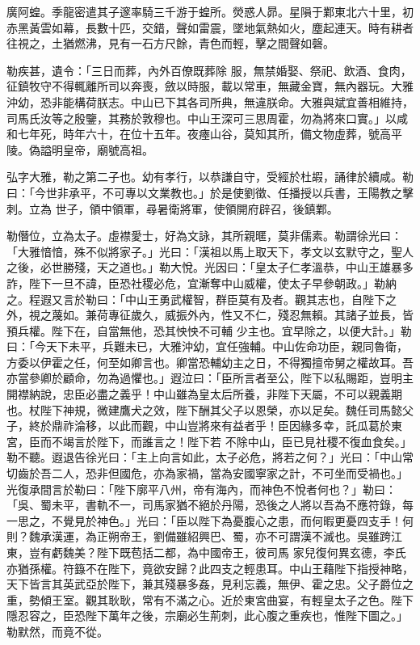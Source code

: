 \begin{pinyinscope}
 廣阿蝗。季龍密遣其子邃率騎三千游于蝗所。熒惑人昴。星隕于鄴東北六十里，初赤黑黃雲如幕，長數十匹，交錯，聲如雷震，墜地氣熱如火，塵起連天。時有耕者往視之，土猶燃沸，見有一石方尺餘，青色而輕，擊之間聲如磬。



 勒疾甚，遺令：「三日而葬，內外百僚既葬除
 服，無禁婚娶、祭祀、飲酒、食肉，征鎮牧守不得輒離所司以奔喪，斂以時服，載以常車，無藏金寶，無內器玩。大雅沖幼，恐非能構荷朕志。中山已下其各司所典，無違朕命。大雅與斌宜善相維持，司馬氏汝等之殷鑒，其務於敦穆也。中山王深可三思周霍，勿為將來口實。」以咸和七年死，時年六十，在位十五年。夜瘞山谷，莫知其所，備文物虛葬，號高平陵。偽謚明皇帝，廟號高祖。



 弘字大雅，勒之第二子也。幼有孝行，以恭謙自守，受經於杜嘏，誦律於續咸。勒曰：「今世非承平，不可專以文業教也。」於是使劉徵、任播授以兵書，王陽教之擊刺。立為
 世子，領中領軍，尋暑衛將軍，使領開府辟召，後鎮鄴。



 勒僭位，立為太子。虛襟愛士，好為文詠，其所親暱，莫非儒素。勒謂徐光曰：「大雅愔愔，殊不似將家子。」光曰：「漢祖以馬上取天下，孝文以玄默守之，聖人之後，必世勝殘，天之道也。」勒大悅。光因曰：「皇太子仁孝溫恭，中山王雄暴多詐，陛下一旦不諱，臣恐社稷必危，宜漸奪中山威權，使太子早參朝政。」勒納之。程遐又言於勒曰：「中山王勇武權智，群臣莫有及者。觀其志也，自陛下之外，視之蔑如。兼荷專征歲久，威振外內，性又不仁，殘忍無賴。其諸子並長，皆預兵權。陛下在，自當無他，恐其怏怏不可輔
 少主也。宜早除之，以便大計。」勒曰：「今天下未平，兵難未已，大雅沖幼，宜任強輔。中山佐命功臣，親同魯衛，方委以伊霍之任，何至如卿言也。卿當恐輔幼主之日，不得獨擅帝舅之權故耳。吾亦當參卿於顧命，勿為過懼也。」遐泣曰：「臣所言者至公，陛下以私賜距，豈明主開襟納說，忠臣必盡之義乎！中山雖為皇太后所養，非陛下天屬，不可以親義期也。杖陛下神規，微建鷹犬之效，陛下酬其父子以恩榮，亦以足矣。魏任司馬懿父子，終於鼎祚淪移，以此而觀，中山豈將來有益者乎！臣因緣多幸，託瓜葛於東宮，臣而不竭言於陛下，而誰言之！陛下若
 不除中山，臣已見社稷不復血食矣。」勒不聽。遐退告徐光曰：「主上向言如此，太子必危，將若之何？」光曰：「中山常切齒於吾二人，恐非但國危，亦為家禍，當為安國寧家之計，不可坐而受禍也。」光復承間言於勒曰：「陛下廓平八州，帝有海內，而神色不悅者何也？」勒曰：「吳、蜀未平，書軌不一，司馬家猶不絕於丹陽，恐後之人將以吾為不應符錄，每一思之，不覺見於神色。」光曰：「臣以陛下為憂腹心之患，而何暇更憂四支手！何則？魏承漢運，為正朔帝王，劉備雖紹興巴、蜀，亦不可謂漢不滅也。吳雖跨江東，豈有虧魏美？陛下既苞括二都，為中國帝王，彼司馬
 家兒復何異玄德，李氏亦猶孫權。符籙不在陛下，竟欲安歸？此四支之輕患耳。中山王藉陛下指授神略，天下皆言其英武亞於陛下，兼其殘暴多姦，見利忘義，無伊、霍之忠。父子爵位之重，勢傾王室。觀其耿耿，常有不滿之心。近於東宮曲宴，有輕皇太子之色。陛下隱忍容之，臣恐陛下萬年之後，宗廟必生荊刺，此心腹之重疾也，惟陛下圖之。」勒默然，而竟不從。




\end{pinyinscope}
